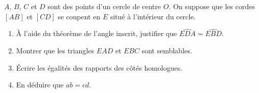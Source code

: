\begin{exercise}
{   
}\hfill
\parbox{0.6\linewidth}{
$A$, $B$, $C$ et $D$ sont des points d'un cercle de centre $O$. On suppose que les cordes $[AB]$ et $[CD]$ se coupent en $E$ situé à l'intérieur du cercle.
\begin{enumerate}[label=\alph*), leftmargin=*]
	\item À l'aide du théorème de l'angle inscrit, justifier que $\widehat{EDA}=\widehat{EBD}$.
	\item Montrer que les triangles $EAD$ et $EBC$ sont semblables.
	\item Écrire les égalités des rapports des côtés homologues.
	\item En déduire que $ab=cd$.
\end{enumerate}
}
\end{exercise}

%	 
 
